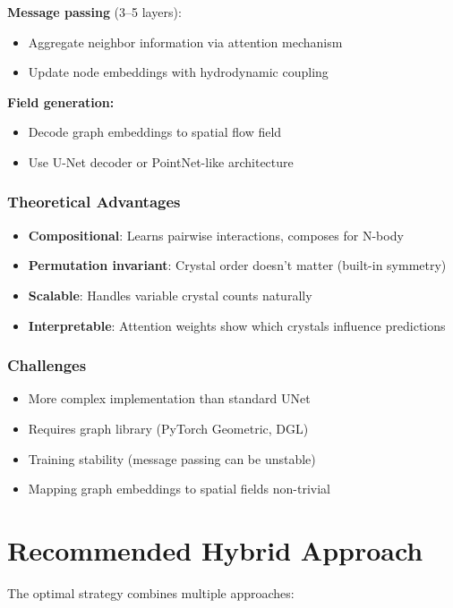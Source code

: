 \textbf{Message passing} (3--5 layers):
\begin{itemize}
    \item Aggregate neighbor information via attention mechanism
    \item Update node embeddings with hydrodynamic coupling
\end{itemize}

\textbf{Field generation:}
\begin{itemize}
    \item Decode graph embeddings to spatial flow field
    \item Use U-Net decoder or PointNet-like architecture
\end{itemize}

\subsubsection{Theoretical Advantages}
\begin{itemize}
    \item \textbf{Compositional}: Learns pairwise interactions, composes for N-body
    \item \textbf{Permutation invariant}: Crystal order doesn't matter (built-in symmetry)
    \item \textbf{Scalable}: Handles variable crystal counts naturally
    \item \textbf{Interpretable}: Attention weights show which crystals influence predictions
\end{itemize}

\subsubsection{Challenges}
\begin{itemize}
    \item More complex implementation than standard UNet
    \item Requires graph library (PyTorch Geometric, DGL)
    \item Training stability (message passing can be unstable)
    \item Mapping graph embeddings to spatial fields non-trivial
\end{itemize}

\section{Recommended Hybrid Approach}

The optimal strategy combines multiple approaches:

